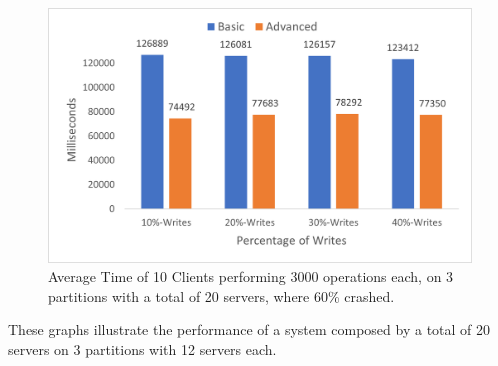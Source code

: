 \documentclass[times, 10pt,twocolumn]{article}
\begin{document}
\newpage
\begin{figure}[h!]
	\centering
	\includegraphics[scale=0.65]{Graphs/Client-20-60.png}
	\caption{Average Time of 10 Clients performing 3000 operations each, on 3 partitions with a total of 20 servers, where 60\% crashed.}
\end{figure}
These graphs illustrate the performance of a system composed by a total of 20 servers on 3 partitions with 12 servers each.
\end{document}
